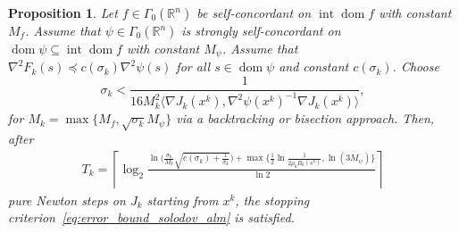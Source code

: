 \documentclass[11pt,onecolumn]{article}
\DeclareMathOperator{\dom}{dom}
\DeclareMathOperator{\intr}{int}
\newcommand{\bR}{\mathbb{R}}
\newtheorem{proposition}[proposition]{Proposition}
\theoremstyle{remark}
\begin{document}
\begin{proposition} \label{thm:complexity_superlinear_sc}
Let $f\in \Gamma_0(\bR^n)$ be self-concordant on $\intr \dom f$ with constant $M_f$. Assume that $\psi\in \Gamma_0(\bR^n)$ is strongly self-concordant on $\dom \psi\subseteq \intr \dom f$ with constant $M_\psi$.
     Assume that $\nabla^2 F_k(s) \preceq c(\sigma_k) \nabla^2 \psi(s)$ for all $s \in \dom \psi$ and constant $c(\sigma_k)$. Choose
\begin{equation} \label{eq:choice_tauk_sc}
    \sigma_k < \frac{1}{16 M_k^2 \langle \nabla J_k(x^k), \nabla^2 \psi(x^k)^{-1} \nabla J_k(x^k)\rangle},
\end{equation}
for $M_k=\max\{M_f, \sqrt{\sigma_k}M_\psi \}$ via a backtracking or bisection approach.
Then, after
\begin{align*}
    T_k = \left\lceil \log_2 \frac{\ln  \Big(\tfrac{\sigma_k}{M_k} \sqrt{c(\sigma_k) + \tfrac{1}{\sigma_k}} \Big) + \max\Big\{ \tfrac{1}{2}\ln\tfrac{1}{2 \rho_k B_k(s^k)},  \ln(3M_\psi )\Big\}}{\ln 2} \right\rceil 
\end{align*}
pure Newton steps on $J_k$ starting from $x^k$, the stopping criterion~\cref{eq:error_bound_solodov_alm} is satisfied.
\end{proposition}
\end{document}

